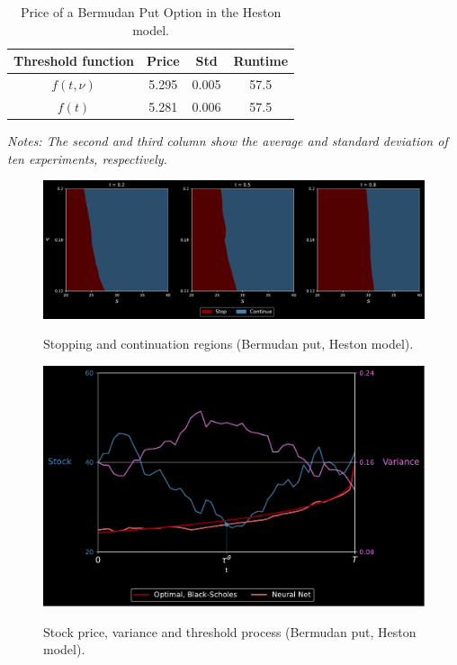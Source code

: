 \begin{table}[ht]
  \centering
  \caption{Price of a Bermudan Put Option in the Heston model.   
 }
  \begin{tabular}{c c c c }
 \hline  \hline
  Threshold function &  Price&  Std& Runtime  \\
  \hline  \hline
    $f(t,\nu)$ & 5.295 & 0.005 &  57.5 \\
  $f(t)$ & 5.281 & 0.006 &  57.5  \\
  \hline
\end{tabular}
\vspace{2mm}

\scriptsize{
\textit{Notes: The second and third column show the average and standard deviation of ten experiments, respectively.  }}
\label{tab:resultPutHeston}
  \end{table}
  
\begin{figure}[t]
    \centering
     \caption{Stopping and continuation regions (Bermudan put, Heston model).}
    \includegraphics[scale = 0.42]{Figures/2DPlotHestonWide.pdf}
    \label{fig:heston1}
\end{figure}


\begin{figure}[t]
    \centering
     \caption{Stock price, variance and threshold process (Bermudan put, Heston model).}
    \includegraphics[scale = 0.42]{Figures/BdryHeston2.pdf}
    \label{fig:heston2}
\end{figure}


